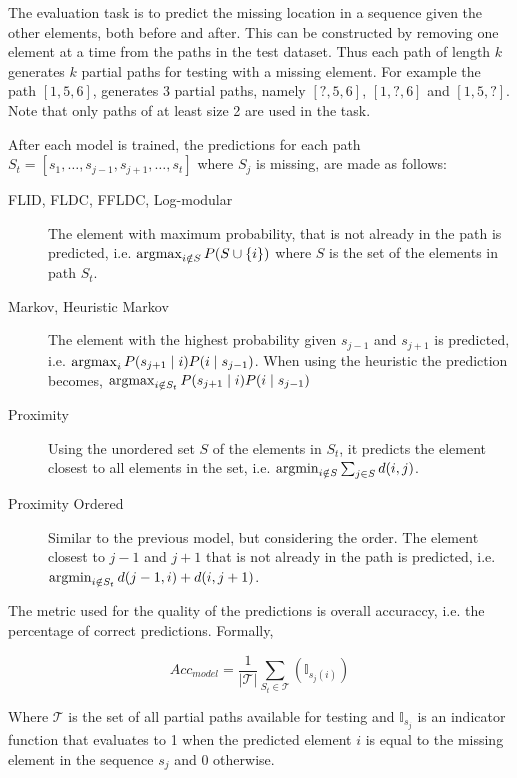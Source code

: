 The evaluation task is to predict the missing location in a sequence given the other elements, both before and after. This can be constructed by removing one element at a time from the paths in the test dataset. Thus each path of length $k$ generates $k$ partial paths for testing with a missing element. For example the path $[1,5,6]$, generates 3 partial paths, namely $[?,5,6]$, $[1,?,6]$ and $[1,5,?]$. Note that only paths of at least size 2 are used in the task.

After each model is trained, the predictions for each path $S_{t} = [s_{1}, \dots, s_{j-1}, s_{j+1}, \dots, s_{t}]$ where $S_{j}$ is missing, are made as follows:

\begin{description}
  \item[FLID, FLDC, FFLDC, Log-modular] The element with maximum probability, that is not already in the path is predicted, i.e. $\operatorname*{argmax}_{i \notin S} P(S \cup \{i\})$ where $S$ is the set of the elements in path $S_{t}$.
  \item[Markov, Heuristic Markov] The element with the highest probability given $s_{j-1}$ and $s_{j+1}$ is predicted, i.e. $\operatorname*{argmax}_{i} P(s_{j+1} \mid i)P(i \mid s_{j-1})$. When using the heuristic the prediction becomes, $\operatorname*{argmax}_{i \notin S_{t}} P(s_{j+1} \mid i)P(i \mid s_{j-1})$
  \item[Proximity] Using the unordered set $S$ of the elements in $S_{t}$, it predicts the element closest to all elements in the set, i.e. $\operatorname*{argmin}_{i \notin S} \sum_{j \in S}d(i, j)$.
  \item[Proximity Ordered] Similar to the previous model, but considering the order. The element closest to $j-1$ and $j+1$ that is not already in the path is predicted, i.e. $\operatorname*{argmin}_{i \notin S_{t}}d(j-1, i) + d(i, j+1)$.
\end{description}

The metric used for the quality of the predictions is overall accuraccy, i.e. the percentage of correct predictions. Formally, 

\begin{equation}
  Acc_{model} = \frac{1}{|\mathcal{T}|}\sum_{S_{t} \in \mathcal{T}}(\mathbb{I}_{s_{j}(i)})
\end{equation}

Where $\mathcal{T}$ is the set of all partial paths available for testing and $\mathbb{I}_{s_{j}}$ is an indicator function that evaluates to 1 when the predicted element $i$ is equal to the missing element in the sequence $s_{j}$ and 0 otherwise.


